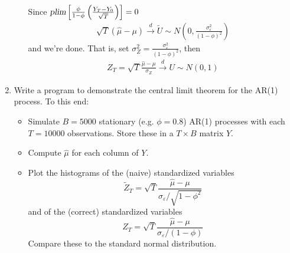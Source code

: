 \documentclass[a4paper]{scrartcl}
\begin{document}
\begin{enumerate}
\begin{enumerate}
\begin{solution}
                            Since $\textsl{plim}\left[\frac{\phi}{1-\phi}\left(\frac{Y_T - Y_0}{\sqrt{T}}\right)\right] = 0$
                            \begin{align*}
                                \sqrt{T}\left(\hat{\mu}-\mu\right) \overset{d}{\rightarrow} \tilde{U} \sim N\left(0,\frac{\sigma_\varepsilon^2}{(1-\phi)^2}\right)
                            \end{align*}
                            and we're done. That is, set $\sigma_Z^2 = \frac{\sigma_\varepsilon^2}{(1-\phi)^2}$, then
                            \begin{align*}
                                Z_T = \sqrt{T}\frac{\hat{\mu}-\mu}{\sigma_Z} \overset{d}{\rightarrow} U \sim N(0,1)
                            \end{align*}
                        \end{solution}
              \end{enumerate}
        \item Write a program to demonstrate the central limit theorem for the AR(1) process. To this end:
              \begin{itemize}
                  \item Simulate $B=5000$ stationary (e.g. $\phi=0.8$) AR(1) processes with each $T=10000$ observations. Store these in a $T \times B$ matrix $Y$.
                  \item Compute $\hat{\mu}$ for each column of $Y$.
                  \item Plot the histograms of the (naive) standardized variables $$ \widetilde{Z}_T = \sqrt{T}\frac{\hat{\mu}-\mu}{\sigma_{\varepsilon }/\sqrt{1-\phi^2}}$$ and of the (correct) standardized variables $$ Z_T = \sqrt{T}\frac{\hat{\mu}-\mu}{\sigma_{\varepsilon }/(1-\phi)}$$ Compare these to the standard normal distribution.
              \end{itemize}
              \begin{solution}~
                  
                  \newpage %
              \end{solution}
    \end{enumerate}
    \newpage
    
    
    
    
\end{document}
